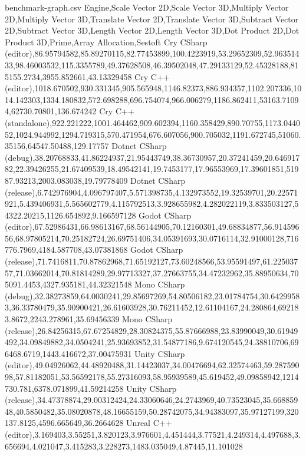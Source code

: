\begin{filecontents*}{benchmark-graph.csv}
Engine,Scale Vector 2D,Scale Vector 3D,Multiply Vector 2D,Multiply Vector 3D,Translate Vector 2D,Translate Vector 3D,Subtract Vector 2D,Subtract Vector 3D,Length Vector 2D,Length Vector 3D,Dot Product 2D,Dot Product 3D,Prime,Array Allocation,Sestoft
Cry CSharp (editor),86.95794582,85.89270115,82.77453899,100.4223919,53.29652309,52.96351433,98.46003532,115.3355789,49.37628508,46.39502048,47.29133129,52.45328188,815155.2734,3955.852661,43.13329458
Cry C++ (editor),1018.670502,930.331345,905.565948,1146.82373,886.934357,1102.207336,1014.142303,1334.180832,572.698288,696.754074,966.006279,1186.862411,53163.71094,62730.70801,136.674242
Cry C++ (standalone),922.221222,1001.464462,909.602394,1160.358429,890.70755,1173.044052,1024.944992,1294.719315,570.471954,676.607056,900.705032,1191.672745,51060.35156,64547.50488,129.17757
Dotnet CSharp (debug),38.20768833,41.86224937,21.95443749,38.36730957,20.37241459,20.64691782,22.39426255,21.67409539,18.49542141,19.7453177,17.96553969,17.39601851,51987.93213,2003.083038,19.79778409
Dotnet CSharp (release),6.742976904,4.096797407,5.571398735,4.132973552,19.32539701,20.22571921,5.439406931,5.565602779,4.115792513,3.928655982,4.282022119,3.833503127,54322.20215,1126.654892,9.166597128
Godot CSharp (editor),67.52986431,66.98613167,68.56144905,70.12160301,49.68834877,56.91459656,68.97805214,70.25182724,26.69751406,34.05391693,30.0716114,32.91000128,716776.7969,4184.587708,43.07381868
Godot CSharp (release),71.7416811,70.87862968,71.65192127,73.60248566,53.95591497,61.22503757,71.03662014,70.81814289,29.97713327,37.27663755,34.47232962,35.88950634,705091.4453,4327.935181,44.32321548
Mono CSharp (debug),32.38273859,64.0030241,29.85697269,54.80506182,23.01784754,30.64299583,36.33780479,35.90900421,26.61603928,30.76211452,12.61104167,24.280864,692183.8672,2243.278961,35.69456339
Mono CSharp (release),26.84256315,67.67254829,28.30824375,55.87666988,23.83990049,30.61949492,34.09849882,34.0504241,25.93693852,31.54877186,9.674120545,24.38810706,696468.6719,1443.416672,37.00475931
Unity CSharp (editor),49.04926062,44.48920488,31.14423037,34.00476694,62.32574463,59.28759098,57.81182051,53.56592178,55.27316093,58.95939589,45.619452,49.09858942,1214730.781,6378.071899,41.59214258
Unity CSharp (release),34.47378874,29.00312424,24.33060646,24.2743969,40.73523045,35.66885948,40.5850482,35.08020878,48.16655159,50.28742075,34.94383097,35.97127199,320137.8125,4596.665649,36.2664628
Unreal C++ (editor),3.169403,3.55251,3.820123,3.976601,4.451444,3.77521,4.249314,4.497688,3.656694,4.021047,3.415283,3.228273,1483.035049,4.87445,11.101028

\end{filecontents*}
